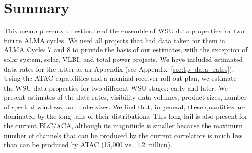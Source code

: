 \documentclass[preprint]{aastex631}
\begin{document}







\section{Summary} \label{sec:summary}

This memo presents an estimate of the ensemble of WSU data properties for two future ALMA cycles. We used all projects that had data taken for them in ALMA Cycles 7 and 8 to provide the basis of our estimates, with the exception of solar system, solar, VLBI, and total power projects. We have included estimated data rates for the latter as an Appendix (see Appendix~\ref{sec:tp_data_rates}). Using the ATAC capabilities and a nominal receiver roll out plan, we estimate the WSU data properties for two different WSU stages: early and later. We present estimates of the data rates, visibility data volumes, product sizes, number of spectral windows, and cube sizes. We find that, in general, these quantities are dominated by the long tails of their distributions. This long tail is also present for the current BLC/ACA, although its magnitude is smaller because the maximum number of channels that can be produced by the current correlators is much less than can be produced by ATAC (15,000 vs.\ 1.2 million).
\end{document}
